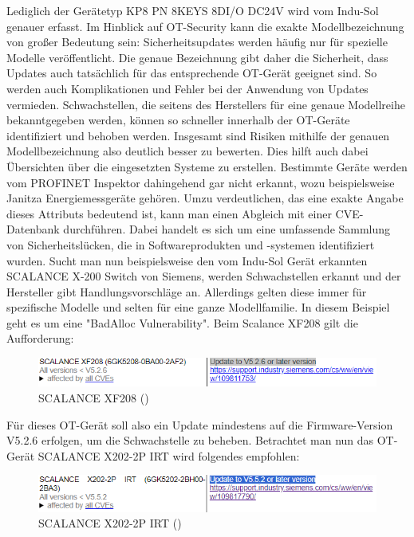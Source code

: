 \noindent Lediglich der Gerätetyp KP8 PN 8KEYS 8DI/O DC24V wird vom Indu-Sol genauer erfasst. Im Hinblick auf OT-Security kann die exakte Modellbezeichnung von großer Bedeutung sein: Sicherheitsupdates werden häufig nur für spezielle Modelle veröffentlicht. Die genaue Bezeichnung gibt daher die Sicherheit, dass Updates auch tatsächlich für das entsprechende OT-Gerät geeignet sind. So werden auch Komplikationen und Fehler bei der Anwendung von Updates vermieden. Schwachstellen, die seitens des Herstellers für eine genaue Modellreihe bekanntgegeben werden, können so schneller innerhalb der OT-Geräte identifiziert und behoben werden. Insgesamt sind Risiken mithilfe der genauen Modellbezeichnung also deutlich besser zu bewerten. Dies hilft auch dabei Übersichten über die eingesetzten Systeme zu erstellen. Bestimmte Geräte werden vom PROFINET Inspektor dahingehend gar nicht erkannt, wozu beispielsweise Janitza Energiemessgeräte gehören. Umzu verdeutlichen, das eine exakte Angabe dieses Attributs bedeutend ist, kann man einen Abgleich mit einer CVE-Datenbank durchführen. Dabei handelt es sich um eine umfassende Sammlung von Sicherheitslücken, die in Softwareprodukten und -systemen identifiziert wurden. Sucht man nun beispielsweise den vom Indu-Sol Gerät erkannten SCALANCE X-200 Switch von Siemens, werden Schwachstellen erkannt und der Hersteller gibt Handlungsvorschläge an. Allerdings gelten diese immer für spezifische Modelle und selten für eine ganze Modellfamilie. In diesem Beispiel geht es um eine "BadAlloc Vulnerability". Beim Scalance XF208 gilt die Aufforderung: 
\smallskip
\begin{figure}[H]
    \centering
    \includegraphics[width=\textwidth]{images/SCALANCEXF208.PNG}
    \caption{SCALANCE XF208 (\cite{SIEMENS1})}
    \label{fig:scalancexf208}
\end{figure}
\smallskip


\clearpage \noindent Für dieses OT-Gerät soll also ein Update mindestens auf die Firmware-Version V5.2.6 erfolgen, um die Schwachstelle zu beheben. Betrachtet man nun das OT-Gerät SCALANCE X202-2P IRT wird folgendes empfohlen:
\smallskip
\begin{figure}[H]
    \centering
    \includegraphics[width=\textwidth]{images/SCALANCEX202-2PIRT.PNG}
    \caption{SCALANCE X202-2P IRT (\cite{SIEMENS1})}
    \label{fig:scalancex2022pirt}
\end{figure}


